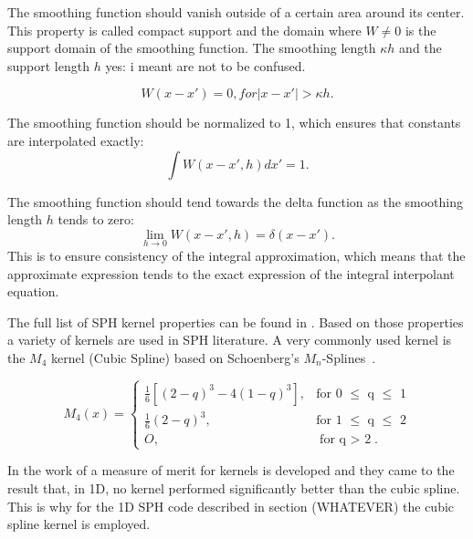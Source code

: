 \documentclass{report}
\begin{document}
The smoothing function should vanish outside of a certain area around its
center. This property is called compact support and the domain where $W\neq0$
is the support domain of the smoothing function. The smoothing length $\kappa h$ and the
support length $h$ 
yes: i meant
are not to be confused.
 
\begin{equation}
W(x-x')=0,\textit{for}|x-x'|>\kappa h.
\end{equation}

The smoothing function should be normalized to 1, which ensures that constants
are interpolated exactly:
\begin{equation}
\int{W(x-x',h)dx'}=1.
\end{equation}

The smoothing function should tend towards the delta function as the smoothing
length $h$ tends to zero:
\begin{equation}
\lim\limits_{h \rightarrow 0}{W(x-x',h)}=\delta(x-x').
\end{equation}
This is to ensure consistency of the integral approximation, which means that
the approximate expression tends to the exact expression of the integral
interpolant equation.

The full list of SPH kernel properties can be found in  \cite{Liu2003}.
Based on those properties a variety of kernels are used in SPH literature. A
very commonly used kernel is the $M_4$ kernel (Cubic Spline) based on Schoenberg's
$M_n$-Splines~\cite{Schoenberg1946}.

\begin{equation}
\label{eq:cubicSpline}
M_{4}(x)=\begin{cases}
\frac{1}{6}[(2-q)^{3}-4(1-q)^{3}],& \text{for 0 $\leq$ q $\leq$ 1} \\
\frac{1}{6}(2-q)^{3},&  \text{for 1 $\leq$ q $\leq$ 2} \\
O,& \text{for q $>$ 2}.
\end{cases}
\end{equation}


In the work of \cite{Fulk1996} a measure of merit for kernels is developed and
they came to the result that, in 1D, no kernel performed significantly better
than the cubic spline.
This is why for the 1D SPH code described in section (WHATEVER) the cubic
spline kernel is employed.
\end{document}
